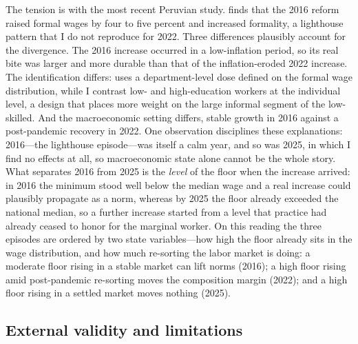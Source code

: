 The tension is with the most recent Peruvian study. \citet{jimenez_2023} finds that the 2016
reform raised formal wages by four to five percent and increased formality, a lighthouse
pattern that I do not reproduce for 2022. Three differences plausibly account for the
divergence. The 2016 increase occurred in a low-inflation period, so its real bite was larger
and more durable than that of the inflation-eroded 2022 increase. The identification differs:
\citet{jimenez_2023} uses a department-level dose defined on the formal wage distribution,
while I contrast low- and high-education workers at the individual level, a design that places
more weight on the large informal segment of the low-skilled. And the macroeconomic setting
differs, stable growth in 2016 against a post-pandemic recovery in 2022. One
observation disciplines these explanations: 2016---the lighthouse episode---was itself
a calm year, and so was 2025, in which I find no effects at all, so macroeconomic
state alone cannot be the whole story. What separates 2016 from 2025 is the
\emph{level} of the floor when the increase arrived: in 2016 the minimum stood well
below the median wage and a real increase could plausibly propagate as a norm, whereas
by 2025 the floor already exceeded the national median, so a further increase started
from a level that practice had already ceased to honor for the marginal worker. On
this reading the three episodes are ordered by two state variables---how high the
floor already sits in the wage distribution, and how much re-sorting the labor market
is doing: a moderate floor rising in a stable market can lift norms (2016); a high
floor rising amid post-pandemic re-sorting moves the composition margin (2022); and a
high floor rising in a settled market moves nothing (2025).

\subsection{External validity and limitations}

